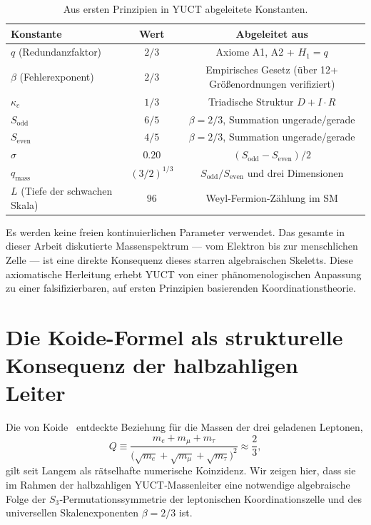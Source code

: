 \documentclass[11pt,a4paper]{article}
\begin{document}
	\begin{table}[H]
		\centering
		\caption{Aus ersten Prinzipien in YUCT abgeleitete Konstanten.}
		\label{tab:derived-constants}
		\begin{tabular}{l c c}
			\toprule
			\textbf{Konstante} & \textbf{Wert} & \textbf{Abgeleitet aus} \\
			\midrule
			\(q\) (Redundanzfaktor) & \(2/3\) & Axiome A1, A2 + \(H_1=q\) \\
			\(\beta\) (Fehlerexponent) & \(2/3\) & Empirisches Gesetz (über 12+ Größenordnungen verifiziert) \\
			\(\kappa_c\) & \(1/3\) & Triadische Struktur \(D+I\!\cdot\!R\) \\
			\(S_{\mathrm{odd}}\) & \(6/5\) & \(\beta=2/3\), Summation ungerade/gerade \\
			\(S_{\mathrm{even}}\) & \(4/5\) & \(\beta=2/3\), Summation ungerade/gerade \\
			\(\sigma\) & \(0.20\) & \((S_{\mathrm{odd}}-S_{\mathrm{even}})/2\) \\
			\(q_{\text{mass}}\) & \((3/2)^{1/3}\) & \(S_{\mathrm{odd}}/S_{\mathrm{even}}\) und drei Dimensionen \\
			\(L\) (Tiefe der schwachen Skala) & \(96\) & Weyl-Fermion-Zählung im SM \\
			\bottomrule
		\end{tabular}
	\end{table}
	
	Es werden keine freien kontinuierlichen Parameter verwendet. Das gesamte in dieser Arbeit diskutierte Massenspektrum — vom Elektron bis zur menschlichen Zelle — ist eine direkte Konsequenz dieses starren algebraischen Skeletts. Diese axiomatische Herleitung erhebt YUCT von einer phänomenologischen Anpassung zu einer falsifizierbaren, auf ersten Prinzipien basierenden Koordinationstheorie.
	
\section{Die Koide-Formel als strukturelle Konsequenz der halbzahligen Leiter}
\label{sec:koide}

Die von Koide~\cite{Koide1983} entdeckte Beziehung für die Massen der drei
geladenen Leptonen,
\begin{equation}
	Q \equiv \frac{m_e + m_\mu + m_\tau}{\bigl(\sqrt{m_e} + \sqrt{m_\mu} + \sqrt{m_\tau}\bigr)^2}
	\approx \frac{2}{3},
\end{equation}
gilt seit Langem als rätselhafte numerische Koinzidenz.  Wir zeigen hier,
dass sie im Rahmen der halbzahligen YUCT‑Massenleiter eine notwendige
algebraische Folge der $S_3$‑Permutationssymmetrie der leptonischen
Koordinationszelle und des universellen Skalenexponenten $\beta = 2/3$ ist.
\end{document}
